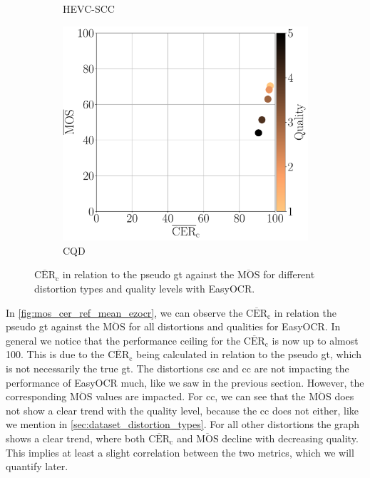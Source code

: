 \begin{figure}
\begin{subfigure}[b]{0.32\textwidth}
        \caption{HEVC-SCC}
        \label{fig:mos_cer_ref_mean_ezocr_HEVC-SCC}
    \end{subfigure}%
    \hfill
    \begin{subfigure}[b]{0.32\textwidth}
        \includegraphics[width=\textwidth]{../../images/analyze/mos_cer_ref_mean_ezocr_CQD.pdf}
        \caption{CQD}
        \label{fig:mos_cer_ref_mean_ezocr_CQD}
    \end{subfigure}%
    \caption{$\overline{\text{CER}}_{\text{c}}$ in relation to the pseudo \gls{gt} against the $\overline{\text{MOS}}$ for different distortion types and quality levels with EasyOCR.}
\label{fig:mos_cer_ref_mean_ezocr}
\end{figure}
In \autoref{fig:mos_cer_ref_mean_ezocr}, we can observe the $\overline{\text{CER}}_{\text{c}}$ in relation the pseudo \gls{gt} against the $\overline{\text{MOS}}$ for all distortions and qualities for EasyOCR.
In general we notice that the performance ceiling for the $\overline{\text{CER}}_{\text{c}}$ is now up to almost 100.
This is due to the $\overline{\text{CER}}_{\text{c}}$ being calculated in relation to the pseudo \gls{gt}, which is not necessarily the true \gls{gt}.
The distortions \gls{csc} and \gls{cc} are not impacting the performance of EasyOCR much, like we saw in the previous section.
However, the corresponding $\overline{\text{MOS}}$ values are impacted.
For \gls{cc}, we can see that the $\overline{\text{MOS}}$ does not show a clear trend with the quality level, because the \gls{cc} does not either, like we mention in \autoref{sec:dataset_distortion_types}.
For all other distortions the graph shows a clear trend, where both $\overline{\text{CER}}_{\text{c}}$ and $\overline{\text{MOS}}$ decline with decreasing quality.
This implies at least a slight correlation between the two metrics, which we will quantify later.

